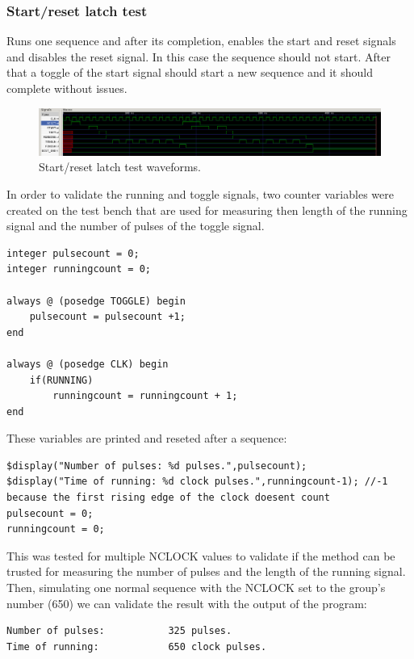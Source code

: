 \documentclass[12pt]{article}
\begin{document}
	\subsubsection*{Start/reset latch test}
	Runs one sequence and after its completion, enables the start and reset signals and disables the reset signal. In this case the sequence should not start. After that a toggle of the start signal should start a new sequence and it should complete without issues.
	
	\begin{figure}[H]
        \centering
        \includegraphics[scale=0.4]{startreset_test.png}
            \caption{Start/reset latch test waveforms.}
            \label{fig:normal_test}
    \end{figure}
	
	In order to validate the running and toggle signals, two counter variables were created on the test bench that are used for measuring then length of the running signal and the number of pulses of the toggle signal.
	    \begin{lstlisting}[caption={Counter variables.},captionpos=b]
integer pulsecount = 0;
integer runningcount = 0;

always @ (posedge TOGGLE) begin
    pulsecount = pulsecount +1; 
end

always @ (posedge CLK) begin
    if(RUNNING)
        runningcount = runningcount + 1;
end
    \end{lstlisting}
    
    These variables are printed and reseted after a sequence:
    \begin{lstlisting}[caption={Conter variable prints.},captionpos=b]
$display("Number of pulses: %d pulses.",pulsecount);
$display("Time of running: %d clock pulses.",runningcount-1); //-1 because the first rising edge of the clock doesent count
pulsecount = 0;
runningcount = 0;
    \end{lstlisting}
    This was tested for multiple NCLOCK values to validate if the method can be trusted for measuring the number of pulses and the length of the running signal. Then, simulating one normal sequence with the NCLOCK set to the group's number (650) we can validate the result with the output of the program:
    \begin{lstlisting}[caption={Toggle and running validation.},captionpos=b]
Number of pulses:           325 pulses.
Time of running:            650 clock pulses.
    \end{lstlisting}    
	
\end{document}
